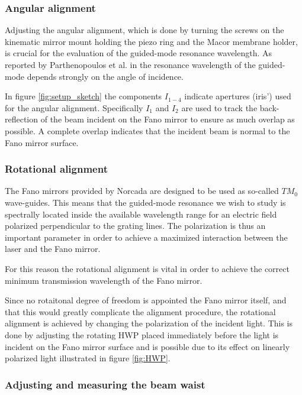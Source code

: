 \subsubsection*{Angular alignment}
Adjusting the angular alignment, which is done by turning the screws on the kinematic mirror mount holding the piezo ring and the Macor membrane holder, is crucial for the evaluation of the guided-mode resonance wavelength. As reported by Parthenopoulos et al. in \cite{Parthenopoulos} the resonance wavelength of the guided-mode depends strongly on the angle of incidence. 

In figure \ref{fig:setup_sketch} the components $I_{1-4}$ indicate apertures (iris') used for the angular alignment. Specifically $I_1$ and $I_2$ are used to track the back-reflection of the beam incident on the Fano mirror to ensure as much overlap as possible. A complete overlap indicates that the incident beam is normal to the Fano mirror surface. 

\subsubsection*{Rotational alignment}
The Fano mirrors provided by Norcada are designed to be used as so-called $TM_0$ wave-guides. This means that the guided-mode resonance we wish to study is spectrally located inside the available wavelength range for an electric field polarized perpendicular to the grating lines. The polarization is thus an important parameter in order to achieve a maximized interaction between the laser and the Fano mirror\cite{Sadov}.

For this reason the rotational alignment is vital in order to achieve the correct minimum transmission wavelength of the Fano mirror. 

Since no rotaitonal degree of freedom is appointed the Fano mirror itself, and that this would greatly complicate the alignment procedure, the rotational alignment is achieved by changing the polarization of the incident light. This is done by adjusting the rotating HWP placed immediately before the light is incident on the Fano mirror surface and is possible due to its effect on linearly polarized light illustrated in figure \ref{fig:HWP}.

\subsubsection{Adjusting and measuring the beam waist}\label{sec:beam_waist}


